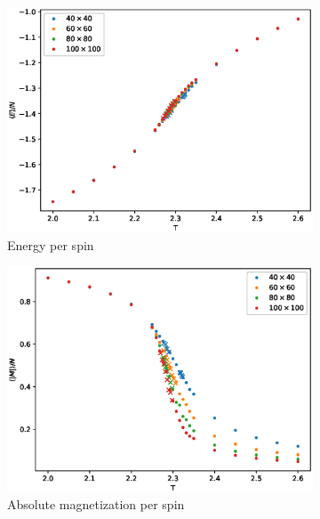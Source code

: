 \documentclass[a4paper,10pt,onecolumn]{article}
\begin{document}
\begin{figure}
	\centering
	\begin{subfigure}{0.5\linewidth}
		\centering
		\includegraphics[width=\linewidth]{energy.eps}
		\caption{Energy per spin}
		\label{fig:E}
	\end{subfigure}%
	\begin{subfigure}{0.5\linewidth}
		\centering
		\includegraphics[width=\linewidth]{magnetization.eps}
		\caption{Absolute magnetization per spin}
		\label{fig:M}
	\end{subfigure}
	\begin{subfigure}{0.5\linewidth}
		\centering

\end{subfigure}
\end{figure}
\end{document}
